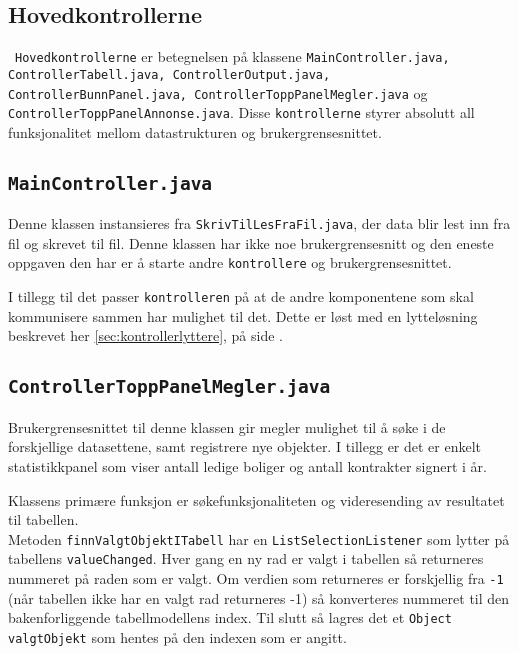\subsection{Hovedkontrollerne} \
\texttt{Hovedkontrollerne} er betegnelsen på klassene \texttt{MainController.java, ControllerTabell.java, ControllerOutput.java, ControllerBunnPanel.java, ControllerToppPanelMegler.java} og \texttt{ControllerToppPanelAnnonse.java}.
Disse \texttt{kontrollerne} styrer absolutt all funksjonalitet mellom datastrukturen og brukergrensesnittet.


\subsection{\texttt{MainController.java}}
Denne klassen instansieres fra \texttt{SkrivTilLesFraFil.java}, der data blir lest inn fra fil og skrevet til fil.
Denne klassen har ikke noe brukergrensesnitt og den eneste oppgaven den har er å starte andre \texttt{kontrollere} og brukergrensesnittet.

I tillegg til det passer \texttt{kontrolleren} på at de andre komponentene som skal kommunisere sammen har mulighet til det. Dette er løst med en lytteløsning beskrevet her \ref{sec:kontrollerlyttere}, på side \pageref{sec:kontrollerlyttere}.


\subsection{\texttt{ControllerToppPanelMegler.java}}
Brukergrensesnittet til denne klassen gir megler mulighet til å søke i de forskjellige datasettene, samt registrere nye objekter.
I tillegg er det er enkelt statistikkpanel som viser antall ledige boliger og antall kontrakter signert i år.

Klassens primære funksjon er søkefunksjonaliteten og videresending av resultatet til tabellen. \\

Metoden \texttt{finnValgtObjektITabell} har en \texttt{ListSelectionListener} som lytter på tabellens \texttt{valueChanged}. Hver gang en ny rad er valgt i tabellen så returneres nummeret på raden som er valgt. Om verdien som returneres er forskjellig fra \texttt{-1} (når tabellen ikke har en valgt rad returneres -1) så konverteres nummeret til den bakenforliggende tabellmodellens index. Til slutt så lagres det et \texttt{Object valgtObjekt} som hentes på den indexen som er angitt. \\


